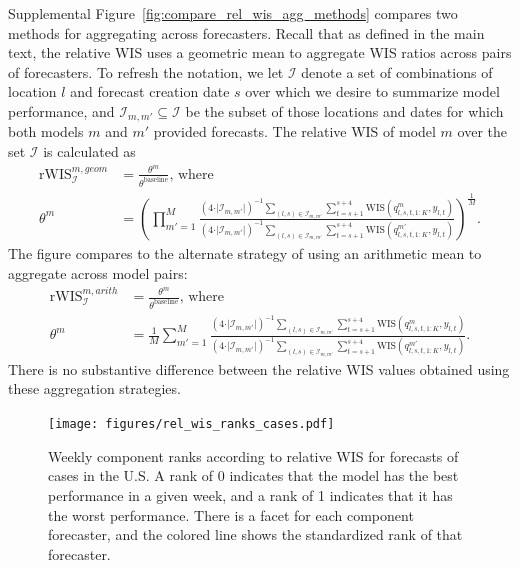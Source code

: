 \documentclass{article}
\def\WIS{\mathrm{WIS}}
\def\rWIS{\mathrm{rWIS}}
\begin{document}
Supplemental Figure~\ref{fig:compare_rel_wis_agg_methods} compares two methods for aggregating across forecasters. Recall that as defined in the main text, the relative WIS uses a geometric mean to aggregate WIS ratios across pairs of forecasters. To refresh the notation, we let $\mathcal{I}$ denote a set of combinations of location $l$ and forecast creation date $s$ over which we desire to summarize model performance, and $\mathcal{I}_{m, m'} \subseteq \mathcal{I}$ be the subset of those locations and dates for which both models $m$ and $m'$ provided forecasts. The relative WIS of model $m$ over the set $\mathcal{I}$ is calculated as
\begin{align*}
\rWIS^{m,geom}_{\mathcal{I}} &= \frac{\theta^m}{\theta^{\text{baseline}}} \text{, where } \\
\theta^m &= \left(\prod_{m'=1}^M \frac{(4 \cdot \vert \mathcal{I}_{m, m'} \vert)^{-1} \sum_{(l, s) \in \mathcal{I}_{m, m'}} \sum_{t=s+1}^{s+4} \WIS(q^m_{l,s,t,1:K},y_{l,t}) }{ (4 \cdot \vert \mathcal{I}_{m, m'} \vert)^{-1} \sum_{(l, s) \in \mathcal{I}_{m, m'}} \sum_{t=s+1}^{s+4} \WIS(q^{m'}_{l,s,t,1:K},y_{l,t})} \right)^{\frac{1}{M}}.
\end{align*}
The figure compares to the alternate strategy of using an arithmetic mean to aggregate across model pairs:
\begin{align*}
\rWIS^{m,arith}_{\mathcal{I}} &= \frac{\theta^m}{\theta^{\text{baseline}}} \text{, where } \\
\theta^m &= \frac{1}{M}\sum_{m'=1}^M \frac{(4 \cdot \vert \mathcal{I}_{m, m'} \vert)^{-1} \sum_{(l, s) \in \mathcal{I}_{m, m'}} \sum_{t=s+1}^{s+4} \WIS(q^m_{l,s,t,1:K},y_{l,t}) }{ (4 \cdot \vert \mathcal{I}_{m, m'} \vert)^{-1} \sum_{(l, s) \in \mathcal{I}_{m, m'}} \sum_{t=s+1}^{s+4} \WIS(q^{m'}_{l,s,t,1:K},y_{l,t})}.
\end{align*}
There is no substantive difference between the relative WIS values obtained using these aggregation strategies.


\begin{figure}[H]
    \centering
    \texttt{[image: figures/rel\_wis\_ranks\_cases.pdf]}
    \caption{Weekly component ranks according to relative WIS for forecasts of cases in the U.S. A rank of 0 indicates that the model has the best performance in a given week, and a rank of 1 indicates that it has the worst performance. There is a facet for each component forecaster, and the colored line shows the standardized rank of that forecaster.}
    \label{fig:rel_wis_ranks_cases}
\end{figure}
\end{document}
